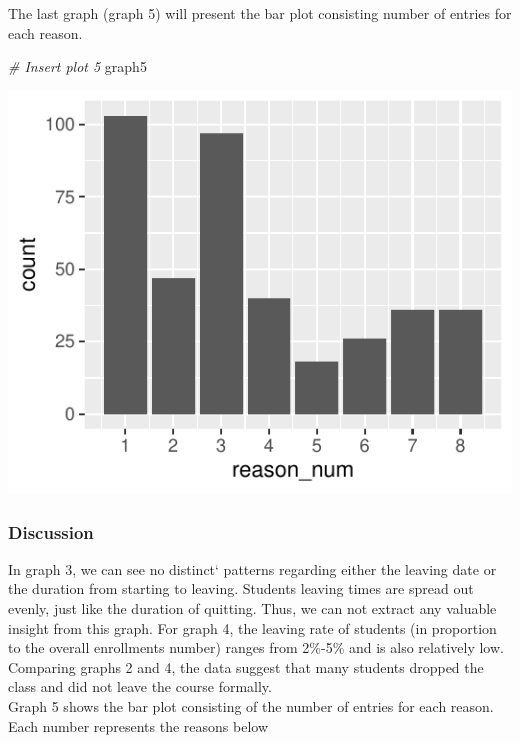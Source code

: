 \documentclass[12pt,]{article}
\newenvironment{Shaded}{\begin{snugshade}}{\end{snugshade}}
\newcommand{\CommentTok}[1]{\textcolor[rgb]{0.56,0.35,0.01}{\textit{#1}}}
\newcommand{\NormalTok}[1]{#1}
\begin{document}
The last graph (graph 5) will present the bar plot consisting number of
entries for each reason.

\begin{Shaded}
\begin{Highlighting}[]
\CommentTok{\# Insert plot 5}
\NormalTok{graph5}
\end{Highlighting}
\end{Shaded}

\begin{center}\includegraphics{report_files/figure-latex/unnamed-chunk-7-1} \end{center}

\hypertarget{discussion-1}{%
\subsubsection{Discussion}\label{discussion-1}}

In graph 3, we can see no distinct` patterns regarding either the
leaving date or the duration from starting to leaving. Students leaving
times are spread out evenly, just like the duration of quitting. Thus,
we can not extract any valuable insight from this graph. For graph 4,
the leaving rate of students (in proportion to the overall enrollments
number) ranges from 2\%-5\% and is also relatively low. Comparing graphs
2 and 4, the data suggest that many students dropped the class and did
not leave the course formally.\\
\hfill\break Graph 5 shows the bar plot consisting of the number of
entries for each reason. Each number represents the reasons below
\end{document}
